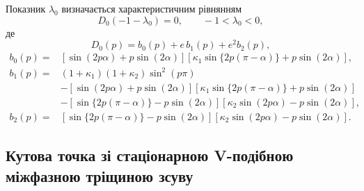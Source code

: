 Показник $\lambda_0$ визначається характеристичним рівнянням
\begin{equation}
\label{eq:app-D0-root}
  D_0(-1-\lambda_0)=0,
  \qquad -1<\lambda_0<0,
\end{equation}
де
\begin{equation*}
  D_0(p)=b_0(p)+e\,b_1(p)+e^2b_2(p),
\end{equation*}
\begin{equation*}
\begin{aligned}
  b_0(p)={}&
  [\sin(2p\alpha)+p\sin(2\alpha)]
  [\kappa_1\sin\{2p(\pi-\alpha)\}+p\sin(2\alpha)],\\[2pt]
  b_1(p)={}&(1+\kappa_1)(1+\kappa_2)\sin^2(p\pi)\\
  &-[\sin(2p\alpha)+p\sin(2\alpha)]
    [\kappa_1\sin\{2p(\pi-\alpha)\}+p\sin(2\alpha)]\\
  &-[\sin\{2p(\pi-\alpha)\}-p\sin(2\alpha)]
    [\kappa_2\sin(2p\alpha)-p\sin(2\alpha)],\\[2pt]
  b_2(p)={}&
  [\sin\{2p(\pi-\alpha)\}-p\sin(2\alpha)]
  [\kappa_2\sin(2p\alpha)-p\sin(2\alpha)].
\end{aligned}
\end{equation*}

\subsection{Кутова точка зі стаціонарною V-подібною міжфазною тріщиною зсуву}

